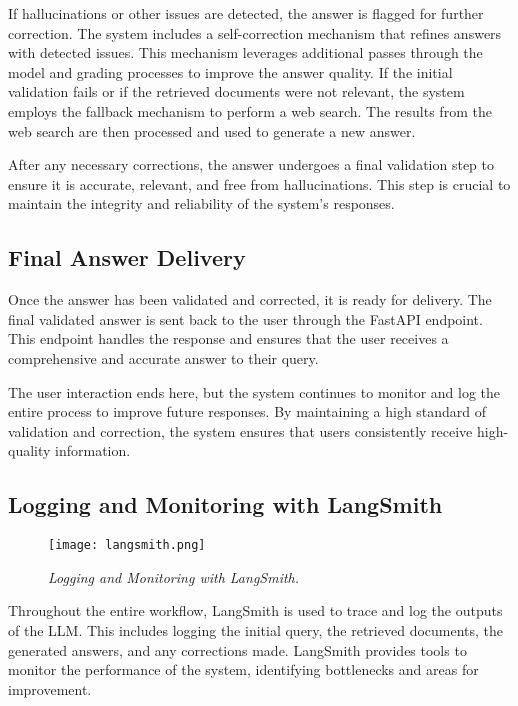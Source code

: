 If hallucinations or other issues are detected, the answer is flagged for further correction. The system includes a self-correction mechanism that refines answers with detected issues. This mechanism leverages additional passes through the model and grading processes to improve the answer quality. If the initial validation fails or if the retrieved documents were not relevant, the system employs the fallback mechanism to perform a web search. The results from the web search are then processed and used to generate a new answer.

After any necessary corrections, the answer undergoes a final validation step to ensure it is accurate, relevant, and free from hallucinations. This step is crucial to maintain the integrity and reliability of the system's responses.

\subsection{Final Answer Delivery}

Once the answer has been validated and corrected, it is ready for delivery. The final validated answer is sent back to the user through the FastAPI endpoint. This endpoint handles the response and ensures that the user receives a comprehensive and accurate answer to their query.

The user interaction ends here, but the system continues to monitor and log the entire process to improve future responses. By maintaining a high standard of validation and correction, the system ensures that users consistently receive high-quality information.

\subsection{Logging and Monitoring with LangSmith}

\begin{figure}[H]
    \centering
    \texttt{[image: langsmith.png]}
    \caption{
        \it{Logging and Monitoring with LangSmith.}
    }
\end{figure}

Throughout the entire workflow, LangSmith is used to trace and log the outputs of the LLM. This includes logging the initial query, the retrieved documents, the generated answers, and any corrections made. LangSmith provides tools to monitor the performance of the system, identifying bottlenecks and areas for improvement.

